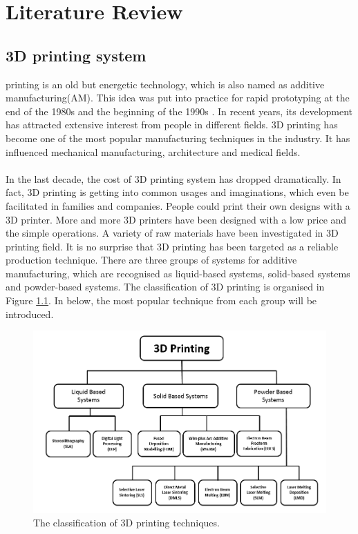 \chapter{Literature Review}
\renewcommand{\baselinestretch}{\mystretch}
\label{chap:Litera}

\section{3D printing system}

 printing is an old but energetic technology, which is also named as additive manufacturing(AM). This idea was put into practice for rapid prototyping at the end of the 1980s and the beginning of the 1990s  \cite{long20173d} . In recent years, its development has attracted extensive interest from people in different fields. 3D printing has become one of the most popular manufacturing techniques in the industry. It has influenced mechanical manufacturing, architecture and medical fields. \\
\\
In the last decade, the cost of 3D printing system has dropped dramatically. In fact, 3D printing is getting into common usages and imaginations, which even be facilitated in families and companies. People could print their own designs with a 3D printer. More and more 3D printers have been designed  with a low price and the simple operations. A variety of raw materials have been investigated in 3D printing field. It is no surprise that 3D printing has been targeted as a reliable production technique. There are three groups of systems for additive manufacturing, which are recognised as liquid-based systems, solid-based systems and powder-based systems. The classification of 3D printing is organised in Figure \ref{Fig:classification}. In below, the most popular technique from each group will be introduced. 

\begin{figure}[htbp]
  \centering
  \includegraphics[scale=0.5]{Figs//3D_print_classification.PNG}
  \caption[The classification of 3D printing techniques]{\footnotesize The classification of 3D printing techniques.}
  \label{Fig:classification}
\end{figure}


